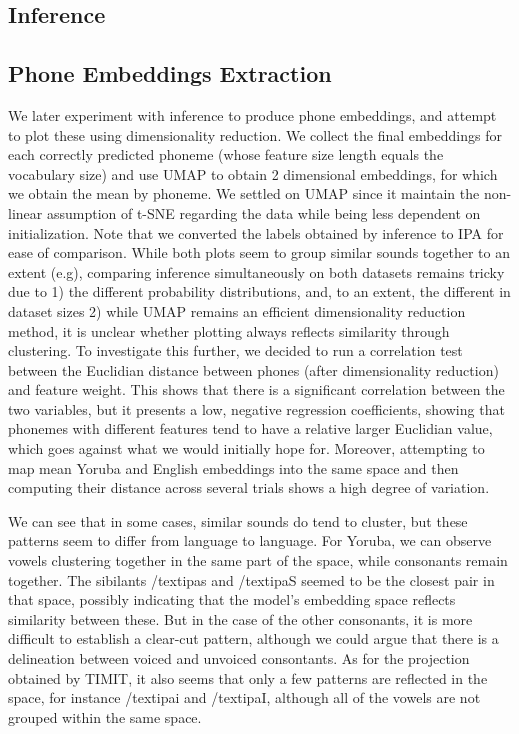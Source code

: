 \documentclass[11pt]{article}
\begin{document}
{\subsection{Inference}

\subsection{Phone Embeddings Extraction}
We later experiment with inference to produce phone embeddings, and attempt to plot these using dimensionality reduction. We collect the final embeddings for each correctly predicted phoneme (whose feature size length equals the vocabulary size) and use UMAP to obtain 2 dimensional embeddings, for which we obtain the mean by phoneme. We settled on UMAP since it maintain the non-linear assumption of t-SNE regarding the data while being less dependent on initialization. Note that we converted the labels obtained by inference to IPA for ease of comparison. While both plots seem to group similar sounds together to an extent (e.g), comparing inference simultaneously on both datasets remains tricky due to 1) the different probability distributions, and, to an extent, the different in dataset sizes 2) while UMAP remains an efficient dimensionality reduction method, it is unclear whether plotting always reflects similarity through clustering.
To investigate this further, we decided to run a correlation test between the Euclidian distance between phones (after dimensionality reduction) and feature weight. This shows that there is a significant correlation between the two variables, but it presents a low, negative regression coefficients, showing that phonemes with different features tend to have a relative larger Euclidian value, which goes against what we would initially hope for. Moreover, attempting to map mean Yoruba and English embeddings into the same space and then computing their distance across several trials shows a high degree of variation.

We can see that in some cases, similar sounds do tend to cluster, but these patterns seem to differ from language to language. For Yoruba, we can observe vowels clustering together
in the same part of the space, while consonants remain together. The sibilants /textipa{s} and /textipa{S} seemed to be the closest pair in that space, possibly indicating that the model's embedding space reflects similarity between these.
But in the case of the other consonants, it is more difficult to establish a clear-cut pattern, although we could argue that there is a delineation between voiced and unvoiced consontants.
As for the projection obtained by TIMIT, it also seems that only a few patterns are reflected in the space, for instance /textipa{i} and  /textipa{I}, although all of the vowels are not grouped within the same space.

}
\end{document}
